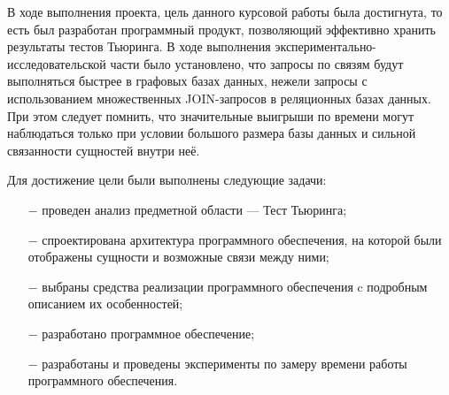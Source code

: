 В ходе выполнения проекта, цель данного курсовой работы была достигнута, то есть был разработан программный продукт, позволяющий эффективно хранить результаты тестов Тьюринга.
В ходе выполнения экспериментально-исследовательской части было установлено, что запросы по связям будут выполняться быстрее в графовых базах данных, нежели запросы с использованием множественных JOIN-запросов в реляционных базах данных.
При этом следует помнить, что значительные выигрыши по времени могут наблюдаться только при условии большого размера базы данных и сильной связанности сущностей внутри неё.

Для достижение цели были выполнены следующие задачи:
\begin{itemize}
    \item[$-$] проведен анализ предметной области --- Тест Тьюринга;
    \item[$-$] спроектирована архитектура программного обеспечения, на которой были отображены сущности и возможные связи между ними;
    \item[$-$] выбраны средства реализации программного обеспечения c подробным описанием их особенностей;
    \item[$-$] разработано программное обеспечение;
    \item[$-$] разработаны и проведены эксперименты по замеру времени работы программного обеспечения.
\end{itemize}

